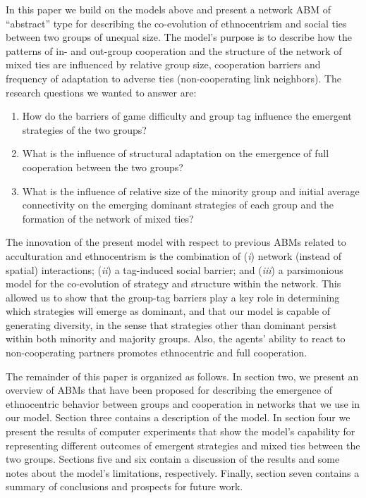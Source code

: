 In this paper we build on the models above and present a network ABM of ``abstract'' type for describing the co-evolution of ethnocentrism and social ties between two groups of unequal size. The model's purpose is to describe how the patterns of in- and out-group cooperation and the structure of the network of mixed ties are influenced by relative group size, cooperation barriers and frequency of adaptation to adverse ties (non-cooperating link neighbors). The research questions we wanted to answer are:
\begin{enumerate}
	\item How do the barriers of game difficulty and group tag influence the emergent strategies of the two groups?
	\item What is the influence of structural adaptation on the emergence of full cooperation between the two groups?
	\item What is the influence of relative size of the minority group and initial average connectivity on the emerging dominant strategies of each group and the formation of the network of mixed ties?
\end{enumerate}

The innovation of the present model with respect to previous ABMs related to acculturation and ethnocentrism is the combination of (\emph{i}) network (instead of spatial) interactions; (\emph{ii}) a tag-induced social barrier; and (\emph{iii}) a parsimonious model for the co-evolution of strategy and structure within the network. This allowed us to show that the group-tag barriers play a key role in determining which strategies will emerge as dominant, and that our model is capable of generating diversity, in the sense that strategies other than dominant persist within both minority and majority groups. Also, the agents' ability to react to non-cooperating partners promotes ethnocentric and full cooperation.

The remainder of this paper is organized as follows. In section two, we present an overview of ABMs that have been proposed for describing the emergence of ethnocentric behavior between groups and cooperation in networks that we use in our model. Section three contains a description of the model. In section four we present the results of computer experiments that show the model's capability for representing different outcomes of emergent strategies and mixed ties between the two groups. Sections five and six contain a discussion of the results and some notes about the model's limitations, respectively. Finally, section seven contains a summary of conclusions and prospects for future work.

